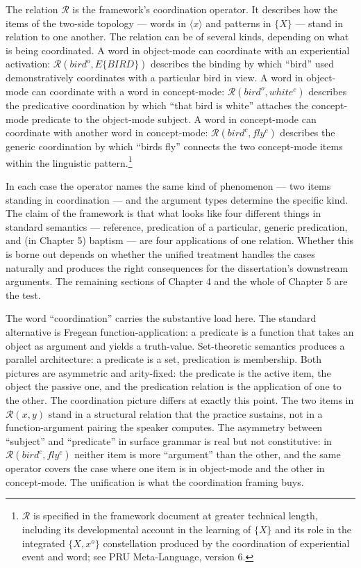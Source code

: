 \documentclass[10pt]{article}
\begin{document}
The relation \(\mathcal{R}\) is the framework's coordination operator. It describes how the items of the two-side topology --- words in \(\langle x \rangle\) and patterns in \(\{X\}\) --- stand in relation to one another. The relation can be of several kinds, depending on what is being coordinated. A word in object-mode can coordinate with an experiential activation: \(\mathcal{R}(bird^o, E\{BIRD\})\) describes the binding by which ``bird'' used demonstratively coordinates with a particular bird in view. A word in object-mode can coordinate with a word in concept-mode: \(\mathcal{R}(bird^o, white^c)\) describes the predicative coordination by which ``that bird is white'' attaches the concept-mode predicate to the object-mode subject. A word in concept-mode can coordinate with another word in concept-mode: \(\mathcal{R}(bird^c, fly^c)\) describes the generic coordination by which ``birds fly'' connects the two concept-mode items within the linguistic pattern.\footnote{\(\mathcal{R}\) is specified in the framework document at greater technical length, including its developmental account in the learning of \(\{X\}\) and its role in the integrated \(\{X, x^o\}\) constellation produced by the coordination of experiential event and word; see PRU Meta-Language, version 6.}

In each case the operator names the same kind of phenomenon --- two items standing in coordination --- and the argument types determine the specific kind. The claim of the framework is that what looks like four different things in standard semantics --- reference, predication of a particular, generic predication, and (in Chapter 5) baptism --- are four applications of one relation. Whether this is borne out depends on whether the unified treatment handles the cases naturally and produces the right consequences for the dissertation's downstream arguments. The remaining sections of Chapter 4 and the whole of Chapter 5 are the test.

The word ``coordination'' carries the substantive load here. The standard alternative is Fregean function-application: a predicate is a function that takes an object as argument and yields a truth-value. Set-theoretic semantics produces a parallel architecture: a predicate is a set, predication is membership. Both pictures are asymmetric and arity-fixed: the predicate is the active item, the object the passive one, and the predication relation is the application of one to the other. The coordination picture differs at exactly this point. The two items in \(\mathcal{R}(x, y)\) stand in a structural relation that the practice sustains, not in a function-argument pairing the speaker computes. The asymmetry between ``subject'' and ``predicate'' in surface grammar is real but not constitutive: in \(\mathcal{R}(bird^c, fly^c)\) neither item is more ``argument'' than the other, and the same operator covers the case where one item is in object-mode and the other in concept-mode. The unification is what the coordination framing buys.
\end{document}
